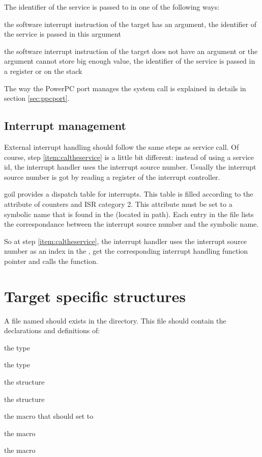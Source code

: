 The identifier of the service is passed to  in one of the following ways:
\begin{pitemize}
\item the software interrupt instruction of the target has an argument, the identifier of the service is passed in this argument
\item the software interrupt instruction of the target does not have an argument or the argument cannot store big enough value, the identifier of the service is passed in a register or on the stack
\end{pitemize}
 

The way the PowerPC port manages the system call is explained in details in section \ref{sec:ppcport}.

\subsection{Interrupt management}

External interrupt handling should follow the same steps as service call. Of course, step  \ref{item:caltheservice} is a little bit different: instead of using a service id, the interrupt handler uses the interrupt source number. Usually the interrupt source number is got by reading a register of the interrupt controller.

goil provides a dispatch table for interrupts. This table is filled according to the  attribute of counters and ISR category 2. This attribute must be set to a symbolic name that is found in the  (located in  path). Each entry in the  file lists the correspondance between the interrupt source number and the symbolic name.

So at step   \ref{item:caltheservice}, the interrupt handler uses the interrupt source number as an index in the , get the corresponding interrupt handling function pointer and calls the function.

\section{Target specific structures}

A file named  should exists in the  directory. This file should contain the declarations and definitions of:

\begin{pitemize}
\item the  type
\item the  type
\item the  structure
\item the  structure
\item the  macro that should set to 
\item the  macro
\item the  macro
\end{pitemize}


